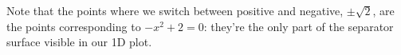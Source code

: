             Note that the points where we switch between positive and negative, $\pm \sqrt{2}$, are the points corresponding to $-x^2+2=0$: they're the only part of the separator surface visible in our 1D plot.


        \secdiv
